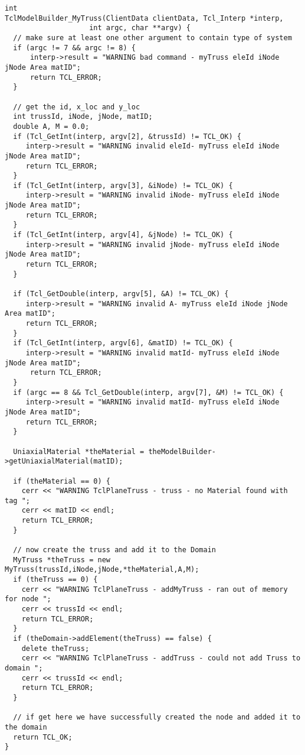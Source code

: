 \documentclass[12pt]{article}
\begin{document}
{\sf \begin{verbatim}
int
TclModelBuilder_MyTruss(ClientData clientData, Tcl_Interp *interp, 
	                int argc, char **argv) {
  // make sure at least one other argument to contain type of system
  if (argc != 7 && argc != 8) {
      interp->result = "WARNING bad command - myTruss eleId iNode jNode Area matID";
      return TCL_ERROR;
  }    

  // get the id, x_loc and y_loc
  int trussId, iNode, jNode, matID;
  double A, M = 0.0;
  if (Tcl_GetInt(interp, argv[2], &trussId) != TCL_OK) {
     interp->result = "WARNING invalid eleId- myTruss eleId iNode jNode Area matID";
     return TCL_ERROR;
  }
  if (Tcl_GetInt(interp, argv[3], &iNode) != TCL_OK) {
     interp->result = "WARNING invalid iNode- myTruss eleId iNode jNode Area matID";
     return TCL_ERROR;
  }
  if (Tcl_GetInt(interp, argv[4], &jNode) != TCL_OK) {
     interp->result = "WARNING invalid jNode- myTruss eleId iNode jNode Area matID";
     return TCL_ERROR;
  }

  if (Tcl_GetDouble(interp, argv[5], &A) != TCL_OK) {
     interp->result = "WARNING invalid A- myTruss eleId iNode jNode Area matID";
     return TCL_ERROR;
  }
  if (Tcl_GetInt(interp, argv[6], &matID) != TCL_OK) {
     interp->result = "WARNING invalid matId- myTruss eleId iNode jNode Area matID";
      return TCL_ERROR;
  }
  if (argc == 8 && Tcl_GetDouble(interp, argv[7], &M) != TCL_OK) {
     interp->result = "WARNING invalid matId- myTruss eleId iNode jNode Area matID";
     return TCL_ERROR;
  }  
  
  UniaxialMaterial *theMaterial = theModelBuilder->getUniaxialMaterial(matID);

  if (theMaterial == 0) {
    cerr << "WARNING TclPlaneTruss - truss - no Material found with tag ";
    cerr << matID << endl;
    return TCL_ERROR;
  }

  // now create the truss and add it to the Domain
  MyTruss *theTruss = new MyTruss(trussId,iNode,jNode,*theMaterial,A,M);
  if (theTruss == 0) {
    cerr << "WARNING TclPlaneTruss - addMyTruss - ran out of memory for node ";
    cerr << trussId << endl;
    return TCL_ERROR;
  }
  if (theDomain->addElement(theTruss) == false) {
    delete theTruss;
    cerr << "WARNING TclPlaneTruss - addTruss - could not add Truss to domain ";
    cerr << trussId << endl;
    return TCL_ERROR;
  }

  // if get here we have successfully created the node and added it to the domain
  return TCL_OK;
}
\end{verbatim}}
\end{document}
